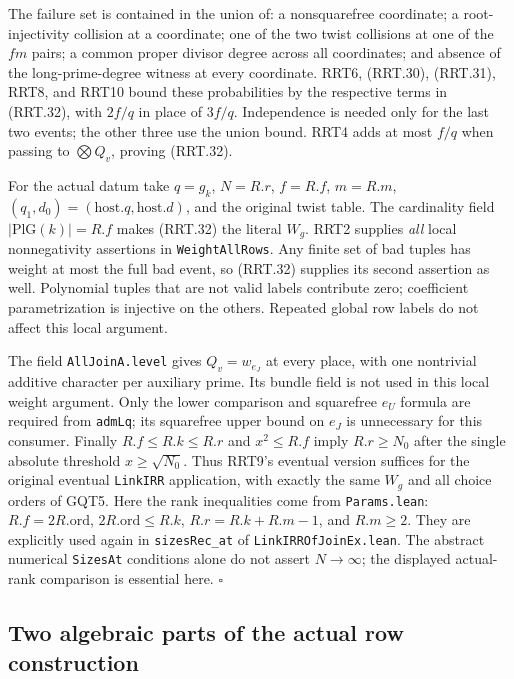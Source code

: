 The failure set is contained in the union of: a nonsquarefree
coordinate; a root-injectivity collision at a coordinate; one
of the two twist collisions at one of the $fm$ pairs; a common
proper divisor degree across all coordinates; and absence of
the long-prime-degree witness at every coordinate.  RRT6,
(RRT.30), (RRT.31), RRT8, and RRT10 bound these probabilities
by the respective terms in (RRT.32), with $2f/q$ in place of
$3f/q$.  Independence is needed only for the last two events;
the other three use the union bound.  RRT4 adds at most $f/q$
when passing to $\bigotimes Q_v$, proving (RRT.32).

For the actual datum take $q=g_k$, $N=R.r$, $f=R.f$,
$m=R.m$, $(q_1,d_0)=(\mathrm{host}.q,\mathrm{host}.d)$, and
the original twist table.  The cardinality field
$|\mathrm{PlG}(k)|=R.f$ makes (RRT.32) the literal $W_g$.
RRT2 supplies \emph{all} local nonnegativity assertions in
\texttt{WeightAllRows}.  Any finite set of bad tuples has
weight at most the full bad event, so (RRT.32) supplies its
second assertion as well.  Polynomial tuples that are not
valid labels contribute zero; coefficient parametrization is
injective on the others.  Repeated global row labels do not
affect this local argument.

The field \texttt{AllJoinA.level} gives $Q_v=w_{e_J}$ at
every place, with one nontrivial additive character per
auxiliary prime.  Its bundle field is not used in this local
weight argument.  Only the lower comparison and squarefree
$e_U$ formula are required from \texttt{admLq}; its
squarefree upper bound on $e_J$ is unnecessary for this
consumer.  Finally $R.f\le R.k\le R.r$ and
$x^2\le R.f$ imply $R.r\ge N_0$ after the single absolute
threshold $x\ge\sqrt{N_0}$.  Thus RRT9's eventual version
suffices for the original eventual \texttt{LinkIRR}
application, with exactly the same $W_g$ and all choice orders
of GQT5.  Here the rank inequalities come from
\texttt{Params.lean}: $R.f=2R.\mathrm{ord}$,
$2R.\mathrm{ord}\le R.k$, $R.r=R.k+R.m-1$, and $R.m\ge2$.
They are explicitly used again in \texttt{sizesRec\_at} of
\texttt{LinkIRROfJoinEx.lean}.  The abstract numerical
\texttt{SizesAt} conditions alone do not assert $N\to\infty$;
the displayed actual-rank comparison is essential here.
\hfill$\square$

\subsection{Two algebraic parts of the actual row construction}

